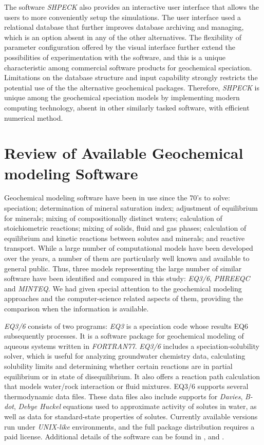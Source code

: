 \documentclass[preprint,12pt,3p]{elsarticle}
\begin{document}
The software \emph{SHPECK} also provides an interactive user interface that allows the users to more conveniently setup the simulations. The user interface used a relational database that further improves database archiving and managing, which is an option absent in any of the other alternatives.  The flexibility of parameter configuration offered by the visual interface further extend the possibilities of experimentation with the software, and this is a unique characteristic among commercial software products for geochemical speciation. Limitations on the database structure and input capability strongly restricts the potential use of the the alternative geochemical packages. Therefore, \emph{SHPECK} is unique among the geochemical speciation models by implementing modern computing technology, absent in other similarly tasked software, with efficient numerical method.


\section{Review of Available Geochemical modeling Software}
Geochemical modeling software have been in use since the 70’s to solve: speciation; determination of mineral saturation index; adjustment of equilibrium for minerals; mixing of compositionally distinct  waters; calculation of stoichiometric reactions; mixing of solids, fluid and gas phases; calculation of equilibrium and kinetic reactions between solutes and minerals; and reactive transport. While a large number of computational models have been developed over the years, a number of them are particularly well known and available to general public. Thus, three models representing the large number of similar software have been identified and compared in this study: \emph{EQ3/6}, \emph{PHREEQC} and \emph{MINTEQ}. We had given special attention to the geochemical modeling approaches and the computer-science related aspects of them, providing the comparison when the information is available. 

\emph{EQ3/6} consists of two programs: \emph{EQ3} is a speciation code whose results EQ6 subsequently processes. It is a software package for geochemical modeling of aqueous systems written in \emph{FORTRAN77}. \emph{EQ3/6} includes a speciation-solubility solver, which is useful for analyzing groundwater chemistry data, calculating solubility limits and determining whether certain reactions are in partial equilibrium or in state of disequilibrium. It also offers a reaction path calculation that models water/rock interaction or fluid mixtures. EQ3/6 supports several thermodynamic data files. These data files also include supports for \emph{Davies}, \emph{B-dot}, \emph{Debye Huckel} equations used to approximate activity of solutes in water, as well as data for standard-state properties of solutes. Currently available versions run under \emph{UNIX-like} environments, and the full package distribution requires a paid license. Additional details of the software can be found in \cite{Wolery:1979}, \cite{Wolery:1990} and \cite{Wolery:1992}.
\end{document}

